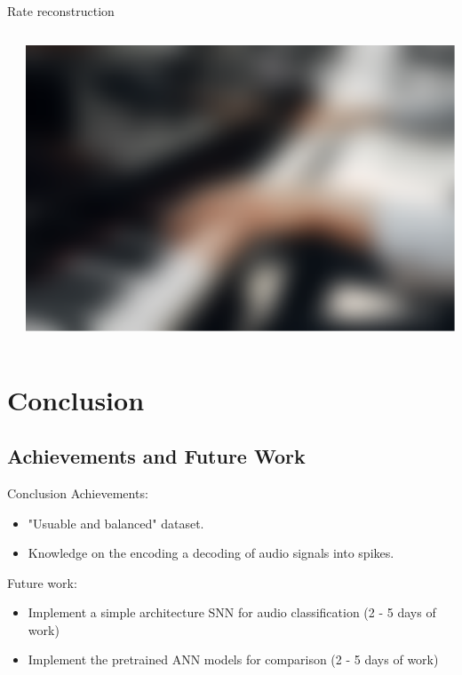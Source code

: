 \documentclass[aspectratio=169, 11pt]{beamer}
\begin{document}
\begin{frame}{Rate reconstruction}
  \begin{columns}
    \begin{column}{0.5\textwidth}
      \centering
    \end{column}
    \begin{column}{0.5\textwidth}
      \includegraphics[width=\textwidth]{image/piano_blur3.png}
    \end{column}
  \end{columns}
\end{frame}

\section{Conclusion}

\subsection{Achievements and Future Work}
\begin{frame}{Conclusion}
  Achievements:
  \begin{itemize}
    \item "Usuable and balanced" dataset.
    \item Knowledge on the encoding a decoding of audio signals into spikes.
  \end{itemize}
  Future work:
  \begin{itemize}
    \item Implement a simple architecture SNN for audio classification (2 - 5 days of work)
    \item Implement the pretrained ANN models for comparison (2 - 5 days of work)
  \end{itemize}
\end{frame}
\end{document}
